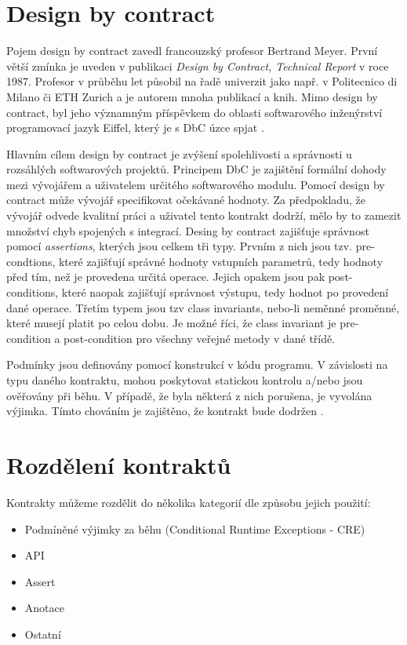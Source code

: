	\section{Design by contract}
		Pojem design by contract zavedl francouzský profesor Bertrand Meyer. První větší zmínka je uveden v publikaci \emph{Design by Contract, Technical Report} v roce 1987. Profesor v průběhu let působil na řadě univerzit jako např. v Politecnico di Milano či ETH Zurich a je autorem mnoha publikací a knih. Mimo design by contract, byl jeho významným příspěvkem do oblasti softwarového inženýrství programovací jazyk Eiffel, který je s DbC úzce spjat \cite{meyerBio}\cite{DesignByContractComponentware}\cite{eiffel}.	
	
		Hlavním cílem design by contract je zvýšení spolehlivosti a správnosti u rozsáhlých softwarových projektů. Principem DbC je zajištění formální dohody mezi vývojářem a uživatelem určitého softwarového modulu. Pomocí design by contract může vývojář specifikovat očekávané hodnoty. Za předpokladu, že vývojář odvede kvalitní práci a uživatel tento kontrakt dodrží, mělo by to zamezit množství chyb spojených s integrací. Desing by contract zajišťuje správnost pomocí \emph{assertions}, kterých jsou celkem tři typy. Prvním z nich jsou tzv. pre-condtions, které zajišťují správné hodnoty vstupních parametrů, tedy hodnoty před tím, než je provedena určitá operace. Jejich opakem jsou pak post-conditions, které naopak zajišťují správnost výstupu, tedy hodnot po provedení dané operace. Třetím typem jsou tzv class invariants, nebo-li neměnné proměnné, které musejí platit po celou dobu. Je možné říci, že class invariant je pre-condition a post-condition pro všechny veřejné metody v dané třídě.
	
	Podmínky jsou definovány pomocí konstrukcí v kódu programu. V závislosti na typu daného kontraktu, mohou poskytovat statickou kontrolu a/nebo jsou ověřovány při běhu. V případě, že byla některá z nich porušena, je vyvolána výjimka. Tímto chováním je zajištěno, že kontrakt bude dodržen \cite{contractsInWild}\cite{DesignByContractComponentware}.
	
	\section{Rozdělení kontraktů}
		Kontrakty můžeme rozdělit do několika kategorií dle způsobu jejich použití:
			
		\begin{itemize}
			\item Podmíněné výjimky za běhu (Conditional Runtime Exceptions - CRE)
			\item API
			\item Assert
			\item Anotace
			\item Ostatní
		\end{itemize}				
		
